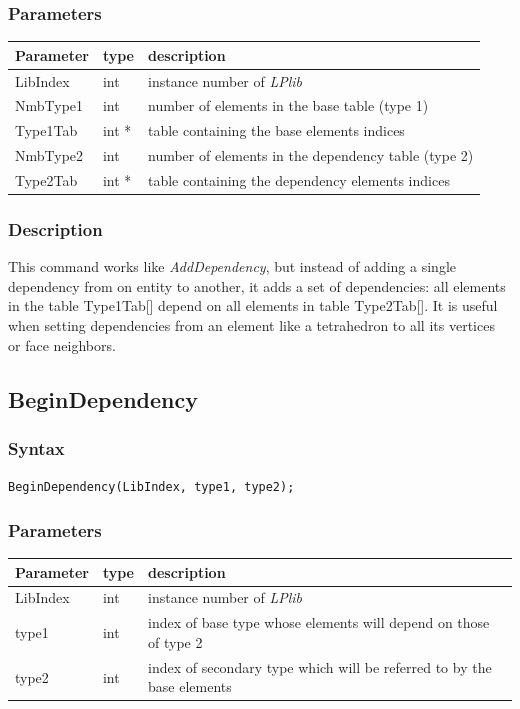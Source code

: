 \documentclass[a4paper,12pt]{article}
\begin{document}
\subsubsection*{Parameters}
\begin{tabular}{|m{2cm}|m{1.5cm}|m{10.5cm}|}
\hline
Parameter  & type   & description \\
\hline
LibIndex   & int    & instance number of \emph{LPlib} \\
\hline
NmbType1   & int    & number of elements in the base table (type 1) \\
\hline
Type1Tab   & int *  & table containing the base elements indices \\
\hline
NmbType2   & int    & number of elements in the dependency table (type 2) \\
\hline
Type2Tab   & int *  & table containing the dependency elements indices \\
\hline
\end{tabular}

\subsubsection*{Description}
This command works like \emph{AddDependency}, but instead of adding a single dependency from on entity to another, it adds a set of dependencies: all elements in the table Type1Tab[] depend on all elements in table Type2Tab[]. It is useful when setting dependencies from an element like a tetrahedron to all its vertices or face neighbors.


\subsection{BeginDependency}

\subsubsection*{Syntax}
\tt{BeginDependency(LibIndex, type1, type2);}
\normalfont

\subsubsection*{Parameters}
\begin{tabular}{|m{2cm}|m{1.5cm}|m{10.5cm}|}
\hline
Parameter  & type   & description \\
\hline
LibIndex   & int    & instance number of \emph{LPlib} \\
\hline
type1      & int    & index of base type whose elements will depend on those of type 2 \\
\hline
type2      & int    & index of secondary type which will be referred to by the base elements \\
\hline
\end{tabular}
\end{document}
